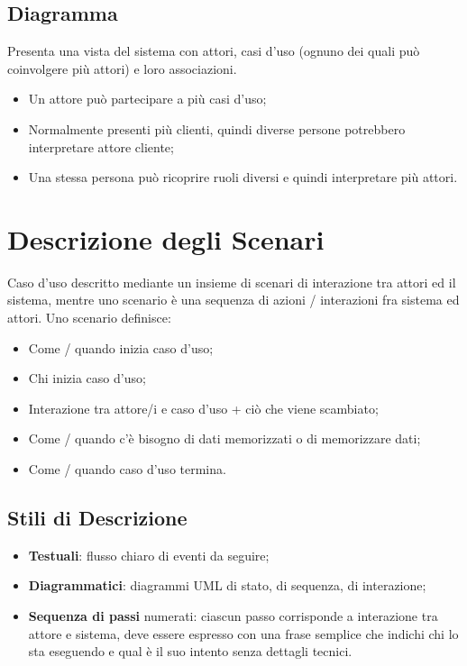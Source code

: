\documentclass{article}
\begin{document}
    \subsection{Diagramma}
      Presenta una vista del sistema con attori, casi d'uso (ognuno dei quali può coinvolgere più attori) e loro associazioni. 
      \begin{itemize}
        \item Un attore può partecipare a più casi d'uso; 
        \item Normalmente presenti più clienti, quindi diverse persone potrebbero interpretare attore cliente;
        \item Una stessa persona può ricoprire ruoli diversi e quindi interpretare più attori.
      \end{itemize}
  \section{Descrizione degli Scenari}
    Caso d'uso descritto mediante un insieme di scenari di interazione tra attori ed il sistema, mentre uno scenario è una sequenza di azioni / interazioni fra sistema ed attori. Uno scenario definisce:
    \begin{itemize}
      \item Come / quando inizia caso d'uso; 
      \item Chi inizia caso d'uso; 
      \item Interazione tra attore/i e caso d'uso + ciò che viene scambiato;
      \item Come / quando c'è bisogno di dati memorizzati o di memorizzare dati;
      \item Come / quando caso d'uso termina.
    \end{itemize}
    \subsection{Stili di Descrizione}
      \begin{itemize}
        \item \textbf{Testuali}: flusso chiaro di eventi da seguire; 
        \item \textbf{Diagrammatici}: diagrammi UML di stato, di sequenza, di interazione;
        \item \textbf{Sequenza di passi} numerati: ciascun passo corrisponde a interazione tra attore e sistema, deve essere espresso con una frase semplice che indichi chi lo sta eseguendo e qual è il suo intento senza dettagli tecnici.
      \end{itemize}
\end{document}
